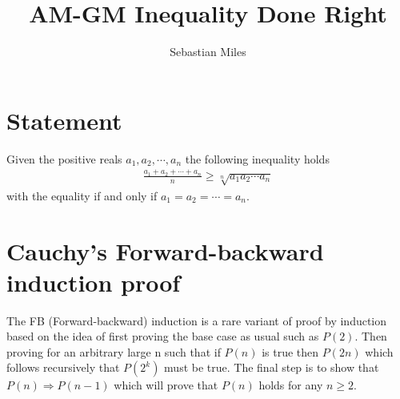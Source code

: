 \documentclass{article}
\title{AM-GM Inequality Done Right}
\author{Sebastian Miles}
\date{}
\begin{document}
	\maketitle
	\section{Statement}
	Given the positive reals $a_1,a_2, \cdots, a_n$ the following inequality holds
	\begin{align*}
		\frac{a_1+a_2+ \cdots + a_n}{n} \geq \sqrt[n]{a_1a_2 \cdots a_n}
	\end{align*}
	with the equality if and only if $a_1=a_2=\cdots=a_n$.
	
	\section{Cauchy's Forward-backward induction proof}
	The FB (Forward-backward) induction is a rare variant of proof by induction based on the idea of first proving the base case as usual such as $P(2)$. Then proving for an arbitrary large n such that if $P(n)$ is true then $P(2n)$ which follows recursively that $P(2^k)$ must be true. The final step is to show that $P(n) \Rightarrow P(n-1)$ which will prove that $P(n)$ holds for any $n \geq 2$.
	
\end{document}
